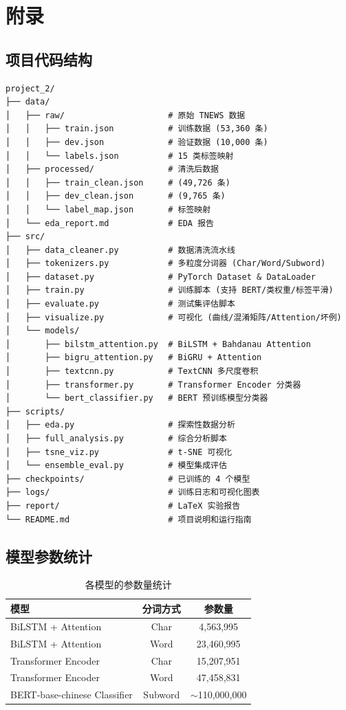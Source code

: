 \chapter{附录}

\section{项目代码结构}

\begin{lstlisting}[style=cleanbash]
project_2/
├── data/
│   ├── raw/                     # 原始 TNEWS 数据
│   │   ├── train.json           # 训练数据 (53,360 条)
│   │   ├── dev.json             # 验证数据 (10,000 条)
│   │   └── labels.json          # 15 类标签映射
│   ├── processed/               # 清洗后数据
│   │   ├── train_clean.json     # (49,726 条)
│   │   ├── dev_clean.json       # (9,765 条)
│   │   └── label_map.json       # 标签映射
│   └── eda_report.md            # EDA 报告
├── src/
│   ├── data_cleaner.py          # 数据清洗流水线
│   ├── tokenizers.py            # 多粒度分词器 (Char/Word/Subword)
│   ├── dataset.py               # PyTorch Dataset & DataLoader
│   ├── train.py                 # 训练脚本 (支持 BERT/类权重/标签平滑)
│   ├── evaluate.py              # 测试集评估脚本
│   ├── visualize.py             # 可视化 (曲线/混淆矩阵/Attention/坏例)
│   └── models/
│       ├── bilstm_attention.py  # BiLSTM + Bahdanau Attention
│       ├── bigru_attention.py   # BiGRU + Attention
│       ├── textcnn.py           # TextCNN 多尺度卷积
│       ├── transformer.py       # Transformer Encoder 分类器
│       └── bert_classifier.py   # BERT 预训练模型分类器
├── scripts/
│   ├── eda.py                   # 探索性数据分析
│   ├── full_analysis.py         # 综合分析脚本
│   ├── tsne_viz.py              # t-SNE 可视化
│   └── ensemble_eval.py         # 模型集成评估
├── checkpoints/                 # 已训练的 4 个模型
├── logs/                        # 训练日志和可视化图表
├── report/                      # LaTeX 实验报告
└── README.md                    # 项目说明和运行指南
\end{lstlisting}

\section{模型参数统计}

\begin{table}[htbp]
\centering
\caption{各模型的参数量统计}
\begin{tabular}{lcc}
\hline
模型 & 分词方式 & 参数量 \\
\hline
BiLSTM + Attention & Char & 4,563,995 \\
BiLSTM + Attention & Word & 23,460,995 \\
Transformer Encoder & Char & 15,207,951 \\
Transformer Encoder & Word & 47,458,831 \\
BERT-base-chinese Classifier & Subword & $\sim$110,000,000 \\
\hline
\end{tabular}
\end{table}

